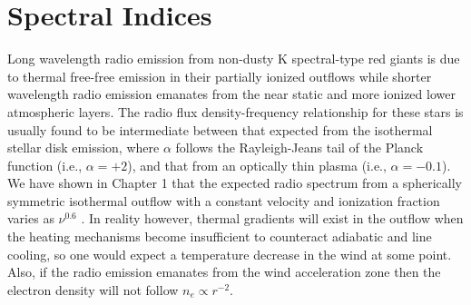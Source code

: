 \section{Spectral Indices}
\label{sec:6.6}
Long wavelength radio emission from non-dusty K spectral-type red giants is due to thermal free-free emission in their partially ionized outflows while shorter wavelength radio emission emanates from the near static and more ionized lower atmospheric layers. The radio flux density-frequency relationship for these stars is usually found to be intermediate between that expected from the isothermal stellar disk emission, where $\alpha$ follows the Rayleigh-Jeans tail of the Planck function (i.e., $\alpha = +2$), and that from an optically thin plasma (i.e., $\alpha = -0.1$). We have shown in Chapter 1 that the expected radio spectrum from a spherically symmetric isothermal outflow with a constant velocity and ionization fraction varies as $\nu ^{0.6}$ \citep{wright_1975,olnon_1975,panagia_1975}. In reality however, thermal gradients will exist in the outflow when the heating mechanisms become insufficient to counteract adiabatic and line cooling, so one would expect a temperature decrease in the wind at some point. Also, if the radio emission emanates from the wind acceleration zone then the electron density will not follow $n_{e} \propto r^{-2}$. 


